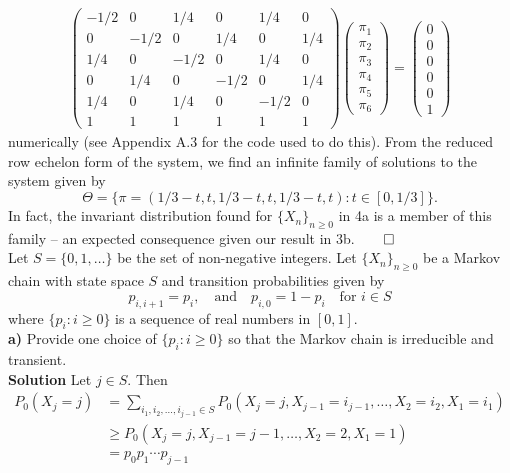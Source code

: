 \documentclass[11pt, letterpaper]{article}
\begin{document}
    \begin{align*}
        \begin{pmatrix}
            -1/2 & 0 & 1/4 & 0 & 1/4 & 0\\
            0 & -1/2 & 0 & 1/4 & 0 & 1/4\\
            1/4 & 0 & -1/2 & 0 & 1/4 & 0\\
            0 & 1/4 & 0 & -1/2 & 0 & 1/4\\
            1/4 & 0 & 1/4 & 0 & -1/2 & 0\\
            1 & 1 & 1 & 1 & 1 & 1
        \end{pmatrix}\begin{pmatrix}
            \pi_1\\
            \pi_2\\
            \pi_3\\
            \pi_4\\
            \pi_5\\
            \pi_6
        \end{pmatrix}=\begin{pmatrix}
            0\\
            0\\
            0\\
            0\\
            0\\
            1
        \end{pmatrix}
    \end{align*}
    numerically (see Appendix A.3 for the code used to do this). From the reduced row echelon form of the system, we find an infinite family of solutions to the system given by
    \[\Theta=\{\pi=(1/3-t,t,1/3-t,t,1/3-t,t):t\in[0,1/3]\}.\]
    In fact, the invariant distribution found for $\{X_n\}_{n\geq 0}$ in 4a is a member of this family -- an expected consequence given our result in 3b.\hfill{$\qed$}\\[10pt]
     Let $S=\{0,1,\dots\}$ be the set of non-negative integers. Let $\{X_n\}_{n\geq 0}$ be a Markov chain with state space $S$ and transition probabilities given by
    \[p_{i,i+1}=p_i,\quad\text{and}\quad p_{i,0}=1-p_i\quad\text{for $i\in S$}\]
    where $\{p_i:i\geq 0\}$ is a sequence of real numbers in $[0,1]$.\\[10pt]
    {\bf a)} Provide one choice of $\{p_i:i\geq 0\}$ so that the Markov chain is irreducible and transient.\\[10pt]
    {\bf Solution} Let $j\in S$. Then 
    \begin{align*}
        P_0(X_j=j)&=\sum_{i_1,i_2,\dots,i_{j-1}\in S}P_0(X_j=j,X_{j-1}=i_{j-1},\dots,X_2=i_2,X_1=i_1)\\
        &\geq P_0(X_j=j,X_{j-1}=j-1,\dots,X_2=2,X_1=1)\\
        &=p_0p_1\cdots p_{j-1}
    \end{align*}
\end{document}
